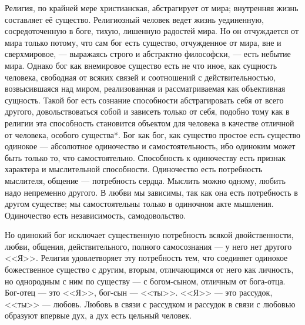 \documentclass[12pt,oneside]{book}
\begin{document}
Религия, по крайней мере христианская, абстрагирует от мира; внутренняя жизнь составляет её существо. Религиозный человек ведет жизнь уединенную, сосредоточенную в боге, тихую, лишенную радостей мира. Но он отчуждается от мира только потому, что сам бог есть существо, отчужденное от мира, вне и сверхмировое, --- выражаясь строго и абстрактно философски, --- есть небытие мира. Однако бог как внемировое существо есть не что иное, как сущность человека, свободная от всяких связей и соотношений с действительностью, возвысившаяся над миром, реализованная и рассматриваемая как объективная сущность. Такой бог есть сознание способности абстрагировать себя от всего другого, довольствоваться собой и зависеть только от себя, подобно тому как в религии эта способность становится объектом для человека в качестве отличной от человека, особого существа*\let\svthefootnote\thefootnote\let\thefootnote\relax{}\let\thefootnote\svthefootnote. Бог как бог, как существо простое есть существо одинокое --- абсолютное одиночество и самостоятельность, ибо одиноким может быть только то, что самостоятельно. Способность к одиночеству есть признак характера и мыслительной способности. Одиночество есть потребность мыслителя, общение --- потребность сердца. Мыслить можно одному, любить надо непременно другого. В любви мы зависимы, так как она есть потребность в другом существе; мы самостоятельны только в одиночном акте мышления. Одиночество есть независимость, самодовольство.

Но одинокий бог исключает существенную потребность всякой двойственности, любви, общения, действительного, полного самосознания --- у него нет другого <<Я>>. Религия удовлетворяет эту потребность тем, что соединяет одинокое божественное существо с другим, вторым, отличающимся от него как личность, но однородным с ним по существу --- с богом-сыном, отличным от бога-отца. Бог-отец --- это <<Я>>, бог-сын --- <<ты>>. <<Я>> --- это рассудок, <<ты>> --- любовь. Любовь в связи с рассудком и рассудок в связи с любовью образуют впервые дух, а дух есть цельный человек.
\end{document}

